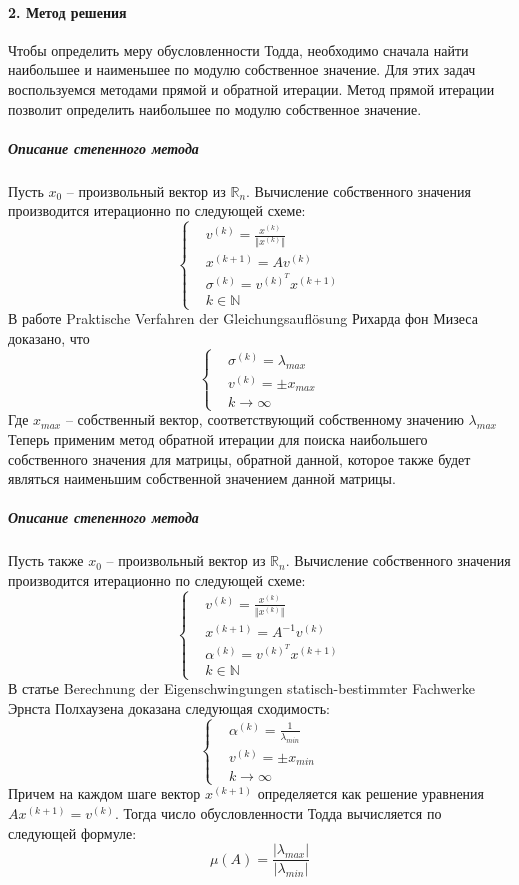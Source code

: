 \documentclass[11pt,a4paper]{report}
\begin{document}
\paragraph{2. Метод решения}
Чтобы определить меру обусловленности Тодда, необходимо сначала найти наибольшее и наименьшее по модулю собственное значение. Для этих задач воспользуемся методами прямой и обратной итерации. Метод прямой итерации позволит определить наибольшее по модулю собственное значение.
\subparagraph{Описание степенного метода}
Пусть $x_0$ -- произвольный вектор из $\mathbb{R}_n$. Вычисление собственного значения производится итерационно по следующей схеме:
\[
\left\{\begin{aligned}
&v^{(k)} = \frac{x^{(k)}}{\Vert x^{(k)} \Vert}\\
&x^{(k+1)} = Av^{(k)}\\
&\sigma^{(k)} = v^{(k)^T}x^{(k+1)}\\
&k \in \mathbb{N}
\end{aligned}\right.
\]
В работе Praktische Verfahren der Gleichungsauflösung Рихарда фон Мизеса доказано, что
\[
\left\{\begin{aligned}
&\sigma^{(k)} = \lambda_{max}\\
&v^{(k)} = \pm x_{max}\\
&k \rightarrow \infty
\end{aligned}\right.
\]
Где $x_{max}$ --  собственный вектор, соответствующий собственному значению $\lambda_{max}$
\newline
Теперь применим метод обратной итерации для поиска наибольшего собственного значения для матрицы, обратной данной, которое также будет являться наименьшим собственной значением данной матрицы.
\subparagraph{Описание степенного метода}
Пусть также $x_0$ -- произвольный вектор из $\mathbb{R}_n$. Вычисление собственного значения производится итерационно по следующей схеме:
\[
\left\{\begin{aligned}
&v^{(k)} = \frac{x^{(k)}}{\Vert x^{(k)} \Vert}\\
&x^{(k+1)} = A^{-1}v^{(k)}\\
&\alpha^{(k)} = v^{(k)^T}x^{(k+1)}\\
&k \in \mathbb{N}
\end{aligned}\right.
\]
В статье Berechnung der Eigenschwingungen statisch-bestimmter Fachwerke Эрнста Полхаузена доказана следующая сходимость:
\[
\left\{\begin{aligned}
&\alpha^{(k)} = \frac{1}{\lambda_{min}}\\
&v^{(k)} = \pm x_{min}\\
&k \rightarrow \infty
\end{aligned}\right.
\]
Причем на каждом шаге вектор $x^{(k+1)}$ определяется как решение уравнения $Ax^{(k+1)} = v^{(k)}$.
Тогда число обусловленности Тодда вычисляется по следующей формуле:
\[
\mu(A) = \frac{|\lambda_{max}|}{|\lambda_{min}|}
\]
\end{document}
